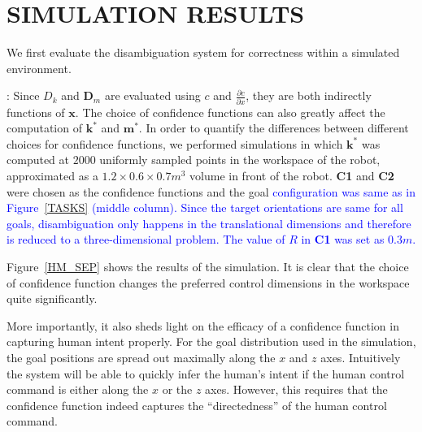 \documentclass[conference]{IEEEtran}
\begin{document}
\section{SIMULATION RESULTS} \label{SIMRESULTS}
We first evaluate the disambiguation system for correctness within a simulated environment.

: Since $D_{k}$ and $\boldsymbol{D}_{m}$ are evaluated using $c$ and $\frac{\partial c}{\partial x}$, they are both indirectly functions of $\boldsymbol{x}$. The choice of confidence functions can also greatly affect the computation of $\boldsymbol{k}^*$ and $\boldsymbol{m}^*$. In order to quantify the differences between different choices for confidence functions, we performed simulations in which $\boldsymbol{k}^*$ was computed at $2000$ uniformly sampled points in the workspace of the robot, approximated as a $1.2\times0.6\times0.7 m^3$ volume in front of the robot. \textbf{C1} and \textbf{C2} were chosen as the confidence functions and the goal \textcolor{blue}{configuration was same as in Figure~\ref{TASKS} (middle column). Since the target orientations are same for all goals, disambiguation only happens in the translational dimensions and therefore is reduced to a three-dimensional problem. The value of $R$ in \textbf{C1} was set as $0.3m$.} 

Figure~\ref{HM_SEP} shows the results of the simulation. It is clear that the choice of confidence function changes the preferred control dimensions in the workspace quite significantly. 

More importantly, it also sheds light on the efficacy of a confidence function in capturing human intent properly. For the goal distribution used in the simulation, the goal positions are spread out maximally along the $x$ and $z$ axes. Intuitively the system will be able to quickly infer the human's intent if the human control command is either along the $x$ or the $z$ axes. However, this requires that the confidence function indeed captures the ``directedness'' of the human control command. 
\end{document}
